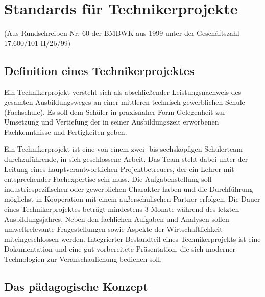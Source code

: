 

\chapter{Standards für Technikerprojekte}

(Aus Rundschreiben Nr. 60 der BMBWK aus 1999 unter der Geschäftszahl 17.600/101-II/2b/99)  

\section{Definition eines Technikerprojektes}

Ein Technikerprojekt versteht sich als abschließender Leistungsnachweis des gesamten Ausbildungsweges an einer mittleren technisch-gewerblichen Schule (Fachschule). Es soll dem Schüler in praxisnaher Form Gelegenheit zur Umsetzung und Vertiefung der in seiner Ausbildungszeit erworbenen Fachkenntnisse und Fertigkeiten geben.

Ein Technikerprojekt ist eine von einem zwei- bis sechsköpfigen Schülerteam durchzuführende, in sich geschlossene Arbeit. Das Team steht dabei unter der Leitung eines hauptverantwortlichen Projektbetreuers, der ein Lehrer mit entsprechender Fachexpertise sein muss. Die Aufgabenstellung soll industriespezifischen oder gewerblichen Charakter haben und die Durchführung möglichst in Kooperation mit einem außerschulischen Partner erfolgen. Die Dauer eines Technikerprojektes beträgt mindestens 3 Monate während des letzten Ausbildungsjahres. Neben den fachlichen Aufgaben und Analysen sollen umweltrelevante Fragestellungen sowie Aspekte der Wirtschaftlichkeit miteingeschlossen werden. Integrierter Bestandteil eines Technikerprojekts ist eine Dokumentation und eine gut vorbereitete Präsentation, die sich moderner Technologien zur Veranschaulichung bedienen soll.

\section{Das pädagogische Konzept}


